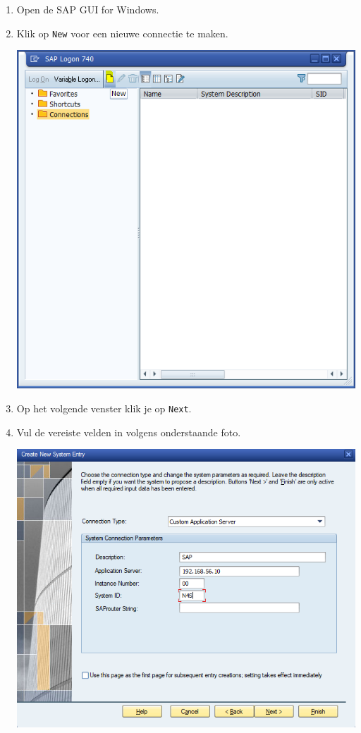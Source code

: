 \documentclass[a4paper, 11pt]{article}
\providecommand{\tightlist}{%
    \setlength{\itemsep}{0pt}
    \setlength{\parskip}{0pt}
}
\begin{document}
\begin{enumerate}
\tightlist
\item
  Open de SAP GUI for Windows.
\item
  Klik op \texttt{New} voor een nieuwe connectie te maken.
\begin{center}
    \includegraphics[scale=0.60,center]{img/windows.png}
\end{center}
\end{enumerate}

\begin{enumerate}
\setcounter{enumi}{2}
\tightlist
\item
  Op het volgende venster klik je op \texttt{Next}.
\item
  Vul de vereiste velden in volgens onderstaande foto.
\begin{center}
    \includegraphics[scale=0.68,center]{img/server.png}
\end{center}
\end{enumerate}
\end{document}
